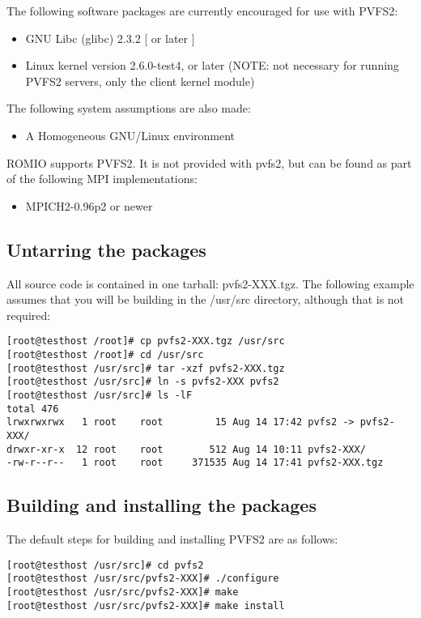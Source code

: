 \documentclass[11pt, letterpaper]{article}
\begin{document}
The following software packages are currently encouraged for use with PVFS2:
\begin{itemize}
\item GNU Libc (glibc) 2.3.2 [ or later ]
\item Linux kernel version 2.6.0-test4, or later (NOTE: not necessary for
  running PVFS2 servers, only the client kernel module)
\end{itemize}

The following system assumptions are also made:
\begin{itemize}
\item A Homogeneous GNU/Linux environment
\end{itemize}

ROMIO supports PVFS2.  It is not provided with pvfs2, but can be found as part
of the following MPI implementations:

\begin{itemize}
\item MPICH2-0.96p2 or newer
\end{itemize}

\subsection{Untarring the packages}

All source code is contained in one tarball: pvfs2-XXX.tgz.  The
following example assumes that you will be building in the /usr/src
directory, although that is not required:

\begin{verbatim}
[root@testhost /root]# cp pvfs2-XXX.tgz /usr/src
[root@testhost /root]# cd /usr/src
[root@testhost /usr/src]# tar -xzf pvfs2-XXX.tgz
[root@testhost /usr/src]# ln -s pvfs2-XXX pvfs2
[root@testhost /usr/src]# ls -lF
total 476
lrwxrwxrwx   1 root    root         15 Aug 14 17:42 pvfs2 -> pvfs2-XXX/
drwxr-xr-x  12 root    root        512 Aug 14 10:11 pvfs2-XXX/
-rw-r--r--   1 root    root     371535 Aug 14 17:41 pvfs2-XXX.tgz

\end{verbatim}

\subsection{Building and installing the packages}

The default steps for building and installing PVFS2 are as follows:

\begin{verbatim}
[root@testhost /usr/src]# cd pvfs2
[root@testhost /usr/src/pvfs2-XXX]# ./configure
[root@testhost /usr/src/pvfs2-XXX]# make
[root@testhost /usr/src/pvfs2-XXX]# make install
\end{verbatim}
\end{document}
